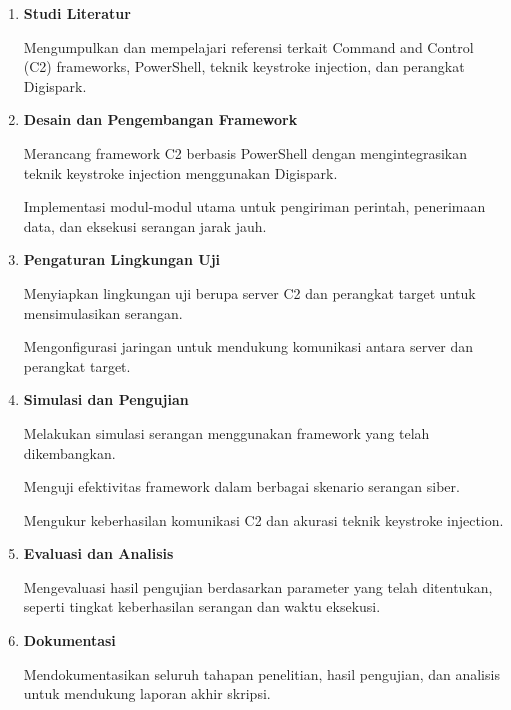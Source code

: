  \begin{enumerate}
     \item \textbf{Studi Literatur}

Mengumpulkan dan mempelajari referensi terkait Command and Control (C2) frameworks, PowerShell, teknik keystroke injection, dan perangkat Digispark.

\item \textbf{Desain dan Pengembangan Framework}

Merancang framework C2 berbasis PowerShell dengan mengintegrasikan teknik keystroke injection menggunakan Digispark.

Implementasi modul-modul utama untuk pengiriman perintah, penerimaan data, dan eksekusi serangan jarak jauh.

 
\item \textbf{Pengaturan Lingkungan Uji}

Menyiapkan lingkungan uji berupa server C2 dan perangkat target untuk mensimulasikan serangan.

 Mengonfigurasi jaringan untuk mendukung komunikasi antara server dan perangkat target.

 
\item \textbf{Simulasi dan Pengujian}

Melakukan simulasi serangan menggunakan framework yang telah dikembangkan.

 Menguji efektivitas framework dalam berbagai skenario serangan siber.

 Mengukur keberhasilan komunikasi C2 dan akurasi teknik keystroke injection.

 
\item \textbf{Evaluasi dan Analisis}

Mengevaluasi hasil pengujian berdasarkan parameter yang telah ditentukan, seperti tingkat keberhasilan serangan dan waktu eksekusi.

\item \textbf{Dokumentasi}

Mendokumentasikan seluruh tahapan penelitian, hasil pengujian, dan analisis untuk mendukung laporan akhir skripsi. 

 \end{enumerate}


 
